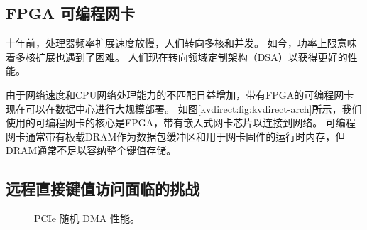 \subsection{FPGA 可编程网卡}
\label{kvdirect:sec:programmable-nic}

十年前，处理器频率扩展速度放慢，人们转向多核和并发\cite {sutter2005free}。
如今，功率上限意味着多核扩展也遇到了困难\cite {esmaeilzadeh2013power}。
人们现在转向领域定制架构（DSA）以获得更好的性能。


由于网络速度和CPU网络处理能力的不匹配日益增加，带有FPGA的可编程网卡 \cite {vfp,greenberg2015sdn,li2016clicknp,caulfield2016cloud} 现在可以在数据中心进行大规模部署。
如图\ref {kvdirect:fig:kvdirect-arch}所示，我们使用的可编程网卡的核心是FPGA，带有嵌入式网卡芯片以连接到网络。
可编程网卡通常带有板载DRAM作为数据包缓冲区和用于网卡固件的运行时内存\cite {li2016clicknp}，但DRAM通常不足以容纳整个键值存储。

\subsection{远程直接键值访问面临的挑战}
\label{kvdirect:sec:challenge}

\begin{figure}[t]
\centering
{}
\caption{PCIe 随机 DMA 性能。}
\label{kvdirect:fig:dma-perf}

\end{figure}

